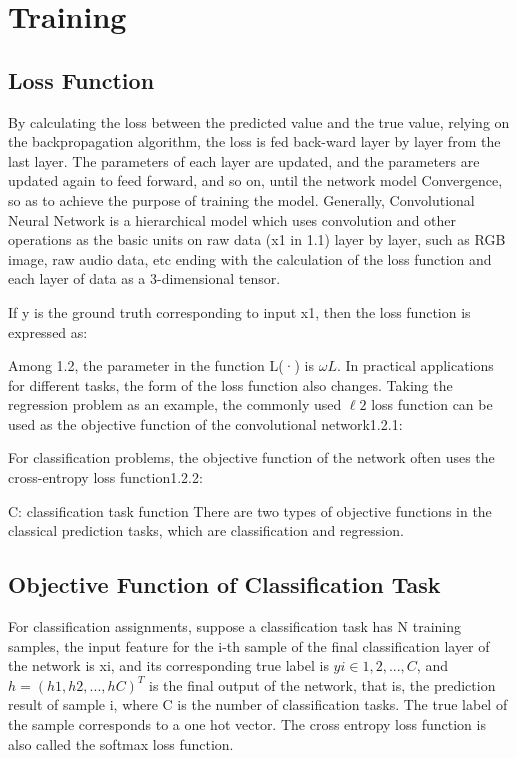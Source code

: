 %
%
\chapter{Training}
\label{cha:training}

\section{Loss Function}
\label{cha:training/loss function}

By calculating the loss between the predicted value and the true value, relying on the backpropagation algorithm, the loss is fed back-ward layer by layer from the last layer. The parameters of each layer are updated, and the parameters are updated again to feed forward, and so on, until the network model Convergence, so as to achieve the purpose of training the model.
Generally, Convolutional Neural Network is a hierarchical model which uses convolution and other operations as the basic units on raw data (x1 in 1.1) layer by layer, such as RGB image, raw audio data, etc ending with the calculation of the loss function and each layer of data as a 3-dimensional tensor.


If y is the ground truth corresponding to input x1, then the loss function is expressed as:

Among 1.2, the parameter in the function L(·) is $\omega L$.
In practical applications for different tasks, the form of the loss function also changes. Taking the regression problem as an example, the commonly used $\ell 2$ loss function can be used as the objective function of the convolutional network1.2.1:


For classification problems, the objective function of the network often uses the cross-entropy loss function1.2.2:

C: classification task function
There are two types of objective functions in the classical prediction tasks, which are classification and regression.


\section{Objective Function of Classification Task}
\label{cha:training/loss function/objective function of classification task}

For classification assignments, suppose a classification task has N training samples, the input feature for the i-th sample of the final classification layer of the network is xi, and its corresponding true label is $yi \in {1, 2,...,C}$, and $h = (h1 , h2,...,hC )^T$ is the final output of the network, that is, the prediction result of sample i, where C is the number of classification tasks. The true label of the sample corresponds to a one hot vector.
The cross entropy loss function is also called the softmax loss function.

